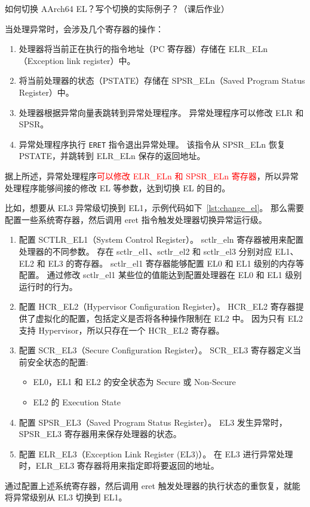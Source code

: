 \begin{probsolu}[title={Problem and Solution \theprob}]{
    如何切换 AArch64 EL？写个切换的实际例子？（课后作业）
  }\label{pb:el_changing}

  当处理异常时，会涉及几个寄存器的操作：
  \begin{enumerate}
    \item 处理器将当前正在执行的指令地址（PC 寄存器）存储在 ELR\_ELn（Exception link register）中。
    \item 将当前处理器的状态（PSTATE）存储在 SPSR\_ELn（Saved Program Status Register）中。
    \item 处理器根据异常向量表跳转到异常处理程序。
    异常处理程序可以修改 ELR 和 SPSR。
    \item 异常处理程序执行 \texttt{ERET} 指令退出异常处理。
    该指令从 SPSR\_ELn 恢复 PSTATE，并跳转到 ELR\_ELn 保存的返回地址。
  \end{enumerate}
  据上所述，异常处理程序\textcolor{red}{可以修改 ELR\_ELn 和 SPSR\_ELn 寄存器}，所以异常处理程序能够间接的修改 EL 等参数，达到切换 EL 的目的。

  比如，想要从 EL3 异常级切换到 EL1，示例代码如下~\ref{lst:change_el}。
  那么需要配置一些系统寄存器，然后调用 eret 指令触发处理器切换异常运行级。

  \begin{enumerate}
    \item 配置 SCTLR\_EL1（System Control Register）。
      sctlr\_eln 寄存器被用来配置处理器的不同参数。
      存在 sctlr\_el1、sctlr\_el2 和 sctlr\_el3 分别对应 EL1、EL2 和 EL3 的寄存器。
      sctlr\_el1 寄存器能够配置 EL0 和 EL1 级别的内存等配置。
      通过修改 sctlr\_el1 某些位的值能达到配置处理器在 EL0 和 EL1 级别运行时的行为。
    \item 配置 HCR\_EL2（Hypervisor Configuration Register）。
      HCR\_EL2 寄存器提供了虚拟化的配置，包括定义是否将各种操作限制在 EL2 中。
      因为只有 EL2 支持 Hypervisor，所以只存在一个 HCR\_EL2 寄存器。
    \item 配置 SCR\_EL3（Secure Configuration Register）。
      SCR\_EL3 寄存器定义当前安全状态的配置:
      \begin{itemize}
        \item EL0，EL1 和 EL2 的安全状态为 Secure 或 Non-Secure
        \item EL2 的 Execution State
      \end{itemize}
    \item 配置 SPSR\_EL3（Saved Program Status Register）。
      EL3 发生异常时，SPSR\_EL3 寄存器用来保存处理器的状态。
    \item 配置 ELR\_EL3（Exception Link Register (EL3)）。
      在 EL3 进行异常处理时，ELR\_EL3 寄存器将用来指定即将要返回的地址。
  \end{enumerate}
  通过配置上述系统寄存器，然后调用 eret 触发处理器的执行状态的重恢复，就能将异常级别从 EL3 切换到 EL1。
\end{probsolu}
